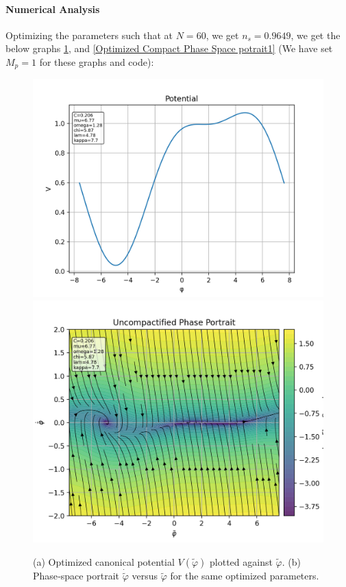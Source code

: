 \documentclass[aps,prd,reprint,preprintnumbers,showpacs,floatfix,nofootinbib,superscript address]{revtex4-2}
\begin{document}
\paragraph*{Numerical Analysis}
Optimizing the parameters such that at $N=60$, we get $n_s = 0.9649$, we get the below graphs \cref{fig:combined_potential_and_phase}, and \cref{Optimized Compact Phase Space potrait1} (We have set $M_p = 1$ for these graphs and code):
\begin{figure}[htb]
  \centering
  {%
    \includegraphics[width=1.0\columnwidth]{../../Python/results/potential.png}%
  }%
  \\[1ex]  %
  {%
    \includegraphics[width=1.0\columnwidth]{../../Python/results/phase_uncompact.png}%
  }%
  \caption{%
    (a) Optimized canonical potential $V(\tilde{\varphi})$ plotted against $\tilde{\varphi}$. 
    (b) Phase‐space portrait $\dot{\tilde{\varphi}}$ versus $\tilde{\varphi}$ for the same optimized parameters.%
  }
  \label{fig:combined_potential_and_phase}
\end{figure}
\end{document}
